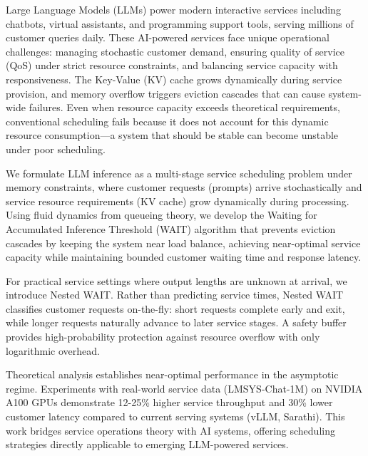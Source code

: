 Large Language Models (LLMs) power modern interactive services including chatbots, virtual assistants, and programming support tools, serving millions of customer queries daily. These AI-powered services face unique operational challenges: managing stochastic customer demand, ensuring quality of service (QoS) under strict resource constraints, and balancing service capacity with responsiveness. The Key-Value (KV) cache grows dynamically during service provision, and memory overflow triggers eviction cascades that can cause system-wide failures. Even when resource capacity exceeds theoretical requirements, conventional scheduling fails because it does not account for this dynamic resource consumption---a system that should be stable can become unstable under poor scheduling.

We formulate LLM inference as a multi-stage service scheduling problem under memory constraints, where customer requests (prompts) arrive stochastically and service resource requirements (KV cache) grow dynamically during processing. Using fluid dynamics from queueing theory, we develop the Waiting for Accumulated Inference Threshold (WAIT) algorithm that prevents eviction cascades by keeping the system near load balance, achieving near-optimal service capacity while maintaining bounded customer waiting time and response latency.

For practical service settings where output lengths are unknown at arrival, we introduce Nested WAIT. Rather than predicting service times, Nested WAIT classifies customer requests on-the-fly: short requests complete early and exit, while longer requests naturally advance to later service stages. A safety buffer provides high-probability protection against resource overflow with only logarithmic overhead.

Theoretical analysis establishes near-optimal performance in the asymptotic regime. Experiments with real-world service data (LMSYS-Chat-1M) on NVIDIA A100 GPUs demonstrate 12-25\% higher service throughput and 30\% lower customer latency compared to current serving systems (vLLM, Sarathi). This work bridges service operations theory with AI systems, offering scheduling strategies directly applicable to emerging LLM-powered services.
